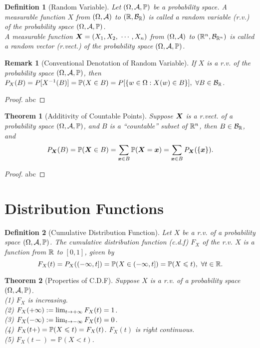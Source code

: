 \documentclass[openany,12pt]{book}
\newtheorem{theorem}{Theorem}[chapter]
\newtheorem{remark}{Remark}[chapter]
\newtheorem{definition}{Definition}[chapter]
\begin{document}
\begin{definition}[Random Variable]
Let $(\Omega,\mathcal{A},\mathbb{P})$ be a probability space. A measurable function $X$ from $(\Omega,\mathcal{A})$ to $(\mathbb{R},\mathcal{B}_{\mathbb{R}})$ is called a random variable (r.v.) of the probability space $(\Omega,\mathcal{A},\mathbb{P})$.\\
A measurable function $\mX=(X_1,X_2,\ \cdots,X_n)$ from $(\Omega,\mathcal{A})$ to $(\mathbb{R}^n,\mathcal{B}_{\mathbb{R}^n})$ is called a random vector (r.vect.) of the probability space $(\Omega,\mathcal{A},\mathbb{P})$.
\end{definition}

\begin{remark}[Conventional Denotation of Random Variable]
If $X$ is a r.v. of the probability space $(\Omega,\mathcal{A},\mathbb{P})$, then $P_X (B)=P[X^{-1} (B)]=\mathbb{P}(X\in B)=P[\{w\in\Omega:X(w)\in B\}],\ \forall B\in\mathcal{B}_{\mathbb{R}}$.
\end{remark}

\begin{proof}
  abc
\end{proof}

\begin{theorem}[Additivity of Countable Points]
Suppose $\bm{X}$ is a r.vect. of a probability space $(\Omega,\mathcal{A},\mathbb{P})$, and $B$ is a ``countable'' subset of $\mathbb{R}^n$, then $B\in\mathcal{B}_{\mathbb{R}}$, and
$$P_{\bm{X}} (B)=\mathbb{P}(\bm{X}\in B)=\sum_{\bm{x}\in B}\mathbb{P}(\bm{X}=\bm{x})=\sum_{\bm{x}\in B}P_{\bm{X}}(\{\bm{x}\}).$$
\end{theorem}

\begin{proof}
  abc
\end{proof}

\section{Distribution Functions}

\begin{definition}[Cumulative Distribution Function]
Let $X$ be a r.v. of a probability space $(\Omega,\mathcal{A},\mathbb{P})$. The cumulative distribution function (c.d.f) $F_X$ of the r.v. $X$ is a function from $\mathbb{R}$ to $[0,1]$, given by
$$F_X (t)=P_X ((-\infty,t])=\mathbb{P}(X\in(-\infty,t])=\mathbb{P}(X\leqslant t),\ \forall t\in\mathbb{R}.$$
\vspace{0.01cm}
\end{definition}

\begin{theorem}[Properties of C.D.F]
Suppose $X$ is a r.v. of a probability space $(\Omega,\mathcal{A},\mathbb{P})$.\\
(1) $F_X$ is increasing.\\
(2) $F_X (+\infty):= \lim_{t\to+\infty} F_X (t)=1$.\\
(3) $F_X (-\infty):= \lim_{t\to-\infty} F_X (t)=0$.\\
(4) $F_X (t+)=\mathbb{P}(X\leqslant t)=F_X (t)$. $F_X (t)$ is right continuous.\\
(5) $F_X (t-)=\mathbb{P}(X<t)$.
\end{theorem}
\end{document}
